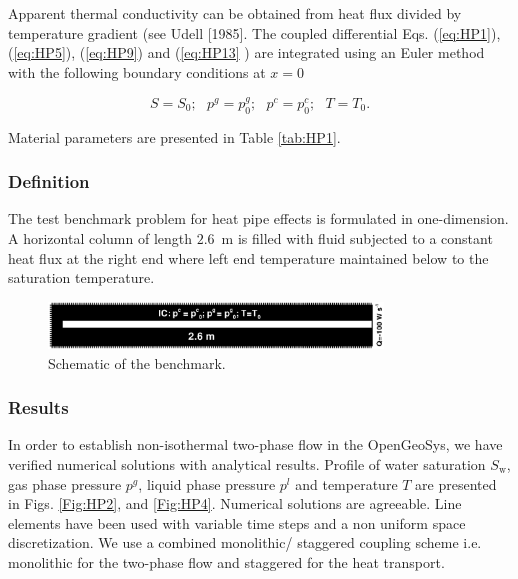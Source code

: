 Apparent thermal conductivity can be obtained from heat flux divided by temperature gradient (see Udell [1985]. The coupled differential Eqs. (\ref{eq:HP1}), (\ref{eq:HP5}), (\ref{eq:HP9}) and (\ref{eq:HP13} ) are integrated using an Euler method with the following boundary conditions at $x=0$

\begin{equation}
S=S_0;~~~ p^g=p^g_0;~~~p^c=p^c_0;~~~T=T_0.
\label{eq:HP14}
\end{equation}

Material parameters are presented in Table \ref{tab:HP1}.

\subsubsection*{Definition}
The test benchmark problem for heat pipe effects is formulated in one-dimension. 
A horizontal column of length $2.6$~m is filled with fluid subjected to a constant heat flux at the right end where left end temperature maintained below to the saturation temperature.

\begin{figure}[!tbh]
\begin{center}
\includegraphics[height=1.25cm]{chapter_13/figures/fig_13_2_14}
\end{center}
\caption{Schematic of the benchmark.}
\label{Fig:HP1}
\end{figure}

\subsubsection*{Results}
In order to establish non-isothermal two-phase flow in the OpenGeoSys, we have verified numerical solutions with analytical results. Profile of water saturation $S_{\mathrm w}$, gas phase pressure $p^g$, liquid phase pressure $p^l$ and temperature $T$ are presented in Figs. \ref{Fig:HP2}, and \ref{Fig:HP4}. Numerical solutions are agreeable. Line elements have been used with variable time steps and a non uniform space discretization. We use a combined monolithic/ staggered coupling scheme i.e. monolithic for the two-phase flow and staggered for the heat transport.

